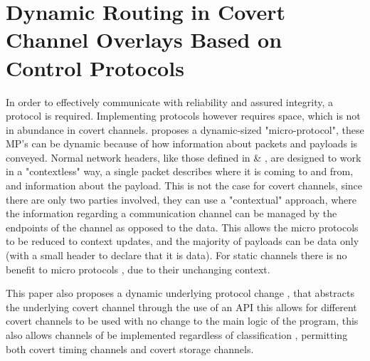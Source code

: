 \section{Dynamic Routing in Covert Channel Overlays Based on Control Protocols}
\label{sec:DRiCCBoCP}

In order to effectively communicate with reliability and assured integrity, a protocol is required. Implementing protocols however requires space, which is not in abundance in covert channels. \cite{DRiCCBoCP} proposes a dynamic-sized "micro-protocol", these MP's can be dynamic because of how information about packets and payloads is conveyed. Normal network headers, like those defined in \cite{rfc791} \& \cite{Trfc793}, are designed to work in a "contextless" way, a single packet describes where it is coming to and from, and information about the payload. This is not the case for covert channels, since there are only two parties involved, they can use a "contextual" approach, where the information regarding a communication channel can be managed by the endpoints of the channel as opposed to the data. This allows the micro protocols to be reduced to context updates, and the majority of payloads can be data only (with a small header to declare that it is data). For static channels there is no benefit to micro protocols \cite{DRiCCBoCP}, due to their unchanging context.

This paper also proposes a dynamic underlying protocol change \cite{DRiCCBoCP}, that abstracts the underlying covert channel through the use of an API this allows for different covert channels to be used with no change to the main logic of the program, this also allows channels of be implemented regardless of classification \cite{DRiCCBoCP}, permitting both covert timing channels and covert storage channels.

